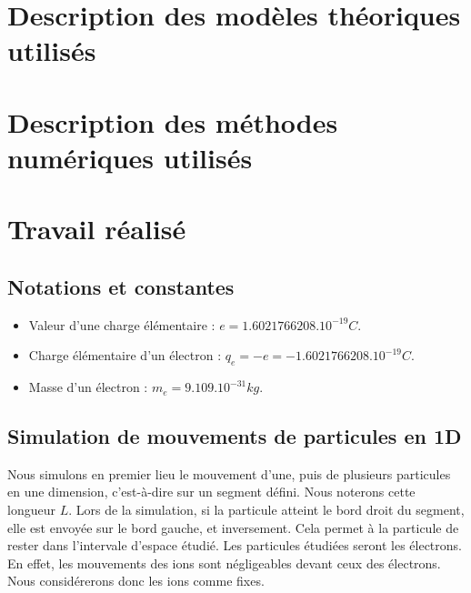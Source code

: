 \documentclass{article}
\begin{document}
\section{Description des modèles théoriques utilisés}
\section{Description des méthodes numériques utilisés}
\section{Travail réalisé}
\subsection{Notations et constantes}
\begin{itemize}
\item Valeur d'une charge élémentaire : $e = 1.6021766208.10^{-19} C$.
\item Charge élémentaire d'un électron : $q_e = -e = -1.6021766208.10^{-19} C$.
\item Masse d'un électron : $m_e = 9.109.10^{-31} kg$.
\end{itemize}
\subsection{Simulation de mouvements de particules en 1D}
Nous simulons en premier lieu le mouvement d'une, puis de plusieurs particules en une dimension, c'est-à-dire sur un segment défini. Nous noterons cette longueur $L$. Lors de la simulation, si la particule atteint le bord droit du segment, elle est envoyée sur le bord gauche, et inversement. Cela permet à la particule de rester dans l'intervale d'espace étudié. Les particules étudiées seront les électrons. En effet, les mouvements des ions sont négligeables devant ceux des électrons. Nous considérerons donc les ions comme fixes.
\end{document}
